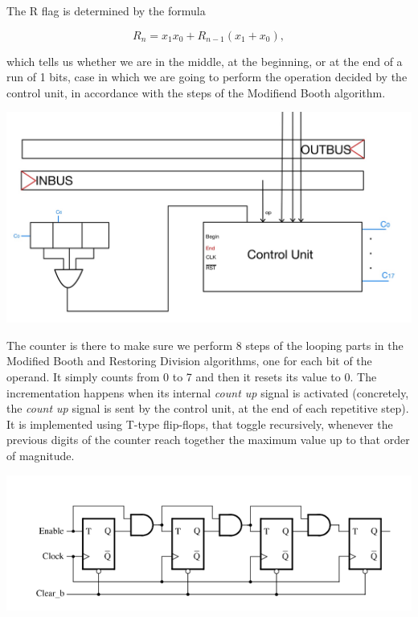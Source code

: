\documentclass[12pt, letterpaper]{article}
\begin{document}
The R flag is determined by the formula

\[ R_n = x_1x_0 + R_{n - 1}(x_1 + x_0), \]

which tells us whether we are in the middle, at the beginning, or at the end of a run of 1 bits, case in which we are going to perform the operation
decided by the control unit, in accordance with the steps of the Modifiend Booth algorithm.

\begin{center}
\includegraphics[scale=0.3]{Documentation/ALU3}
\end{center}

The counter is there to make sure we perform 8 steps of the looping parts in the Modified Booth and Restoring Division algorithms, one for each bit
of the operand. It simply counts from 0 to 7 and then it resets its value to 0. The incrementation happens when its internal \textit{count up} signal
is activated (concretely, the \textit{count up} signal is sent by the control unit, at the end of each repetitive step). It is implemented using
T-type flip-flops, that toggle recursively, whenever the previous digits of the counter reach together the maximum value up to that order of
magnitude.\\

\begin{center}
\includegraphics[scale=0.6]{Documentation/counter}
\end{center}
\end{document}
